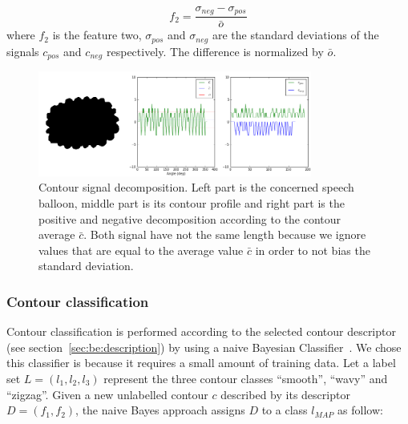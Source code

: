 \begin{equation}\label{eq:be:var_diff}
 f_2 = \frac{\sigma_{neg} - \sigma_{pos}}{\bar{o} }%
\end{equation}
where $f_2$ is the feature two, $\sigma_{pos}$ and $\sigma_{neg}$ are the standard deviations of the signals $c_{pos}$ and $c_{neg}$ respectively. The difference is normalized by $\bar{o}$.%


	\begin{figure}[!ht]	%
	  \centering
		\includegraphics[trim = 0mm 0mm 0mm 0mm, clip, width=340px]{signal_decomposition.png}
		\caption[Contour signal decomposition]{Contour signal decomposition. Left part is the concerned speech balloon, middle part is its contour profile and right part is the positive and negative decomposition according to the contour average $\bar{c}$. Both signal have not the same length because we ignore values that are equal to the average value $\bar{c}$ in order to not bias the standard deviation.}
		\label{fig:be:signal_decomposition}
	\end{figure}


\subsubsection{Contour classification}
Contour classification is performed according to the selected contour descriptor (see section~\ref{sec:be:description}) by using a naive Bayesian Classifier~\cite{Mitchell1997}.
We chose this classifier is because it requires a small amount of training data.
Let a label set $L=(l_1,l_2,l_3)$ represent the three contour classes ``smooth'', ``wavy'' and ``zigzag''. Given a new unlabelled contour $c$ described by its descriptor $D=(f_1,f_2)$, the naive Bayes approach assigns $D$ to a class $l_{MAP}$ as follow:

